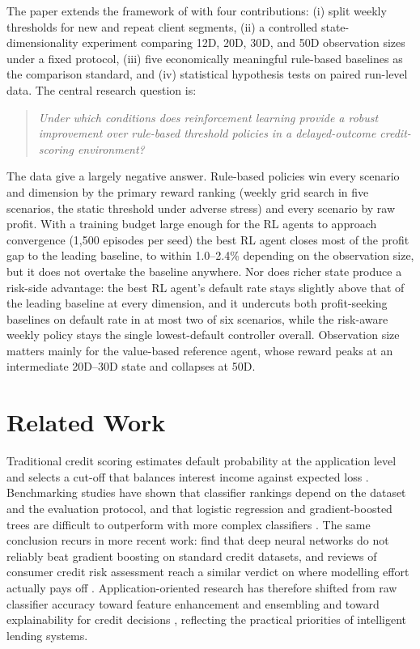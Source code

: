 \documentclass[preprint,review,authoryear,12pt]{elsarticle}
\begin{document}
The paper extends the framework of \citet{herasymovych2019} with four contributions:
(i) split weekly thresholds for new and repeat client segments, (ii) a controlled
state-dimensionality experiment comparing 12D, 20D, 30D, and 50D observation sizes
under a fixed protocol, (iii) five economically meaningful rule-based baselines as the
comparison standard, and (iv) statistical hypothesis tests on paired run-level data.
The central research question is:
\begin{quote}
    \emph{Under which conditions does reinforcement learning provide a robust improvement
        over rule-based threshold policies in a delayed-outcome credit-scoring environment?}
\end{quote}
The data give a largely negative answer. Rule-based policies win every scenario and
dimension by the primary reward ranking (weekly grid search in five scenarios, the static
threshold under adverse stress) and every scenario by raw profit.
With a training budget large enough for the RL agents to approach convergence
(1{,}500 episodes per seed) the best RL agent closes most of the profit gap to the leading
baseline, to within 1.0--2.4\% depending on the observation size, but it does not overtake
the baseline anywhere. Nor does richer state produce a risk-side advantage: the best RL
agent's default rate stays slightly above that of the leading baseline at every
dimension, and it undercuts both profit-seeking baselines on default rate in at most two
of six scenarios, while the risk-aware weekly policy stays the single lowest-default
controller overall. Observation size matters mainly for the value-based reference agent,
whose reward peaks at an intermediate 20D--30D state and collapses at 50D.

\section{Related Work}

Traditional credit scoring estimates default probability at the application level and
selects a cut-off that balances interest income against expected loss
\citep{thomas2017, hand1997, siddiqi2006}. Benchmarking studies have shown that
classifier rankings depend on the dataset and the evaluation protocol, and that
logistic regression and gradient-boosted trees are difficult to outperform with more
complex classifiers \citep{lessmann2015, baesens2003}. The same conclusion recurs in
more recent work: \citet{gunnarsson2021} find that deep neural networks do not reliably
beat gradient boosting on standard credit datasets, and reviews of consumer credit risk
assessment reach a similar verdict on where modelling effort actually pays off
\citep{zhangyu2023}. Application-oriented research has therefore shifted from raw
classifier accuracy toward feature enhancement and ensembling \citep{yang2024}
and toward explainability for credit decisions \citep{nallakaruppan2024}, reflecting the
practical priorities of intelligent lending systems.
\end{document}
